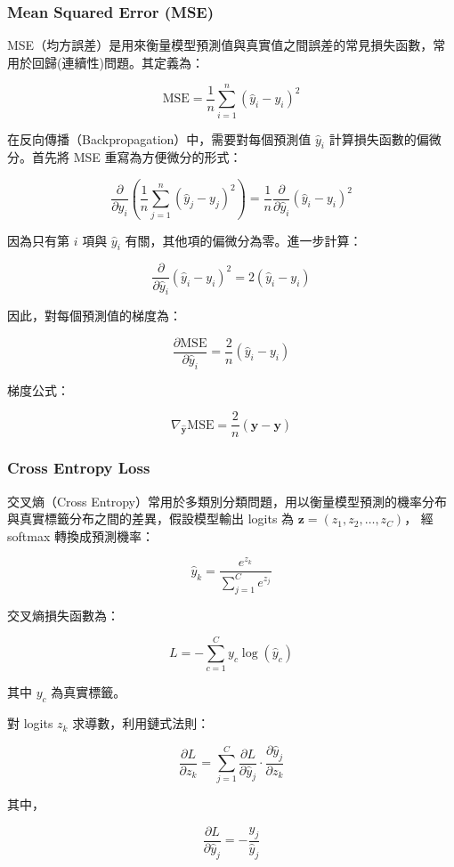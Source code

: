 \documentclass{article}
\begin{document}
\subsubsection{Mean Squared Error (MSE)}

MSE（均方誤差）是用來衡量模型預測值與真實值之間誤差的常見損失函數，常用於回歸(連續性)問題。其定義為：

\[
\text{MSE} = \frac{1}{n} \sum_{i=1}^{n} (\hat{y}_i - y_i)^2
\]

在反向傳播（Backpropagation）中，需要對每個預測值 \(\hat{y}_i\) 計算損失函數的偏微分。首先將 MSE 重寫為方便微分的形式：

\[
\frac{\partial}{\partial \hat{y}_i} \left( \frac{1}{n} \sum_{j=1}^n (\hat{y}_j - y_j)^2 \right)
= \frac{1}{n} \frac{\partial}{\partial \hat{y}_i} (\hat{y}_i - y_i)^2
\]

因為只有第 \(i\) 項與 \(\hat{y}_i\) 有關，其他項的偏微分為零。進一步計算：

\[
\frac{\partial}{\partial \hat{y}_i} (\hat{y}_i - y_i)^2 = 2(\hat{y}_i - y_i)
\]

因此，對每個預測值的梯度為：

\[
\frac{\partial \text{MSE}}{\partial \hat{y}_i}
= \frac{2}{n} (\hat{y}_i - y_i)
\]

梯度公式：

\[
\boxed{
\nabla_{\hat{\mathbf{y}}} \text{MSE}
= \frac{2}{n} (\hat{\mathbf{y}} - \mathbf{y})
}
\]


\subsubsection{Cross Entropy Loss}

交叉熵（Cross Entropy）常用於多類別分類問題，用以衡量模型預測的機率分布與真實標籤分布之間的差異，假設模型輸出 logits 為 \(\mathbf{z} = (z_1, z_2, \ldots, z_C)\)，
經 softmax 轉換成預測機率：

\[
\hat{y}_k = \frac{e^{z_k}}{\sum_{j=1}^C e^{z_j}}
\]

交叉熵損失函數為：

\[
L = - \sum_{c=1}^C y_c \log(\hat{y}_c)
\]

其中 \(y_c\) 為真實標籤。

對 logits \(z_k\) 求導數，利用鏈式法則：

\[
\frac{\partial L}{\partial z_k} 
= \sum_{j=1}^C \frac{\partial L}{\partial \hat{y}_j} \cdot \frac{\partial \hat{y}_j}{\partial z_k}
\]

其中，

\[
\frac{\partial L}{\partial \hat{y}_j} = - \frac{y_j}{\hat{y}_j}
\]
\end{document}
